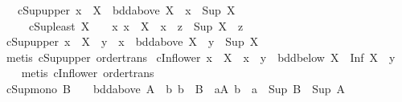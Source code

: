 \begin{isabellebody}
\ \ \ cSup{\isacharunderscore}{\kern0pt}upper{\isacharcolon}{\kern0pt}\ {\isachardoublequoteopen}x\ {\isasymin}\ X\ {\isasymLongrightarrow}\ bdd{\isacharunderscore}{\kern0pt}above\ X\ {\isasymLongrightarrow}\ x\ {\isasymle}\ Sup\ X{\isachardoublequoteclose}\isanewline
\ \ \ \ \ cSup{\isacharunderscore}{\kern0pt}least{\isacharcolon}{\kern0pt}\ {\isachardoublequoteopen}X\ {\isasymnoteq}\ {\isacharbraceleft}{\kern0pt}{\isacharbraceright}{\kern0pt}\ {\isasymLongrightarrow}\ {\isacharparenleft}{\kern0pt}{\isasymAnd}x{\isachardot}{\kern0pt}\ x\ {\isasymin}\ X\ {\isasymLongrightarrow}\ x\ {\isasymle}\ z{\isacharparenright}{\kern0pt}\ {\isasymLongrightarrow}\ Sup\ X\ {\isasymle}\ z{\isachardoublequoteclose}\isanewline
{}\isanewline
\isanewline
{}\isamarkupfalse%
\ cSup{\isacharunderscore}{\kern0pt}upper{}{\isacharcolon}{\kern0pt}\ {\isachardoublequoteopen}x\ {\isasymin}\ X\ {\isasymLongrightarrow}\ y\ {\isasymle}\ x\ {\isasymLongrightarrow}\ bdd{\isacharunderscore}{\kern0pt}above\ X\ {\isasymLongrightarrow}\ y\ {\isasymle}\ Sup\ X{\isachardoublequoteclose}\isanewline
%
\isadelimproof
\ \ %
\endisadelimproof
%
\isatagproof
{}\isamarkupfalse%
\ {\isacharparenleft}{\kern0pt}metis\ cSup{\isacharunderscore}{\kern0pt}upper\ order{\isacharunderscore}{\kern0pt}trans{\isacharparenright}{\kern0pt}%
\endisatagproof
{\isafoldproof}%
%
\isadelimproof
\isanewline
%
\endisadelimproof
\isanewline
{}\isamarkupfalse%
\ cInf{\isacharunderscore}{\kern0pt}lower{}{\isacharcolon}{\kern0pt}\ {\isachardoublequoteopen}x\ {\isasymin}\ X\ {\isasymLongrightarrow}\ x\ {\isasymle}\ y\ {\isasymLongrightarrow}\ bdd{\isacharunderscore}{\kern0pt}below\ X\ {\isasymLongrightarrow}\ Inf\ X\ {\isasymle}\ y{\isachardoublequoteclose}\isanewline
%
\isadelimproof
\ \ %
\endisadelimproof
%
\isatagproof
{}\isamarkupfalse%
\ {\isacharparenleft}{\kern0pt}metis\ cInf{\isacharunderscore}{\kern0pt}lower\ order{\isacharunderscore}{\kern0pt}trans{\isacharparenright}{\kern0pt}%
\endisatagproof
{\isafoldproof}%
%
\isadelimproof
\isanewline
%
\endisadelimproof
\isanewline
{}\isamarkupfalse%
\ cSup{\isacharunderscore}{\kern0pt}mono{\isacharcolon}{\kern0pt}\ {\isachardoublequoteopen}B\ {\isasymnoteq}\ {\isacharbraceleft}{\kern0pt}{\isacharbraceright}{\kern0pt}\ {\isasymLongrightarrow}\ bdd{\isacharunderscore}{\kern0pt}above\ A\ {\isasymLongrightarrow}\ {\isacharparenleft}{\kern0pt}{\isasymAnd}b{\isachardot}{\kern0pt}\ b\ {\isasymin}\ B\ {\isasymLongrightarrow}\ {\isasymexists}a{\isasymin}A{\isachardot}{\kern0pt}\ b\ {\isasymle}\ a{\isacharparenright}{\kern0pt}\ {\isasymLongrightarrow}\ Sup\ B\ {\isasymle}\ Sup\ A{\isachardoublequoteclose}\isanewline

\end{isabellebody}
